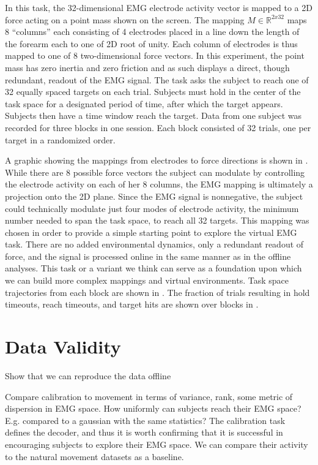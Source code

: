 \documentclass[../main.tex]{subfiles}
\begin{document}
In this task, the 32-dimensional EMG electrode activity vector is mapped to a 2D force acting on a point mass shown on the screen. The mapping $M\in\mathbb{R}^{2 x 32}$ maps 8 ``columns'' each consisting of 4 electrodes placed in a line down the length of the forearm each to one of 2D root of unity. Each column of electrodes is thus mapped to one of 8 two-dimensional force vectors. In this experiment, the point mass has zero inertia and zero friction and as such displays a direct, though redundant, readout of the EMG signal. The task asks the subject to reach one of 32 equally spaced targets on each trial. Subjects must hold in the center of the task space for a designated period of time, after which the target appears. Subjects then have a time window reach the target. Data from one subject was recorded for three blocks in one session. Each block consisted of 32 trials, one per target in a randomized order.

A graphic showing the mappings from electrodes to force directions is shown in . While there are 8 possible force vectors the subject can modulate by controlling the electrode activity on each of her 8 columns, the EMG mapping is ultimately a projection onto the 2D plane. Since the EMG signal is nonnegative, the subject could technically modulate just four modes of electrode activity, the minimum number needed to span the task space, to reach all 32 targets. This mapping was chosen in order to provide a simple starting point to explore the virtual EMG task. There are no added environmental dynamics, only a redundant readout of force, and the signal is processed online in the same manner as in the offline analyses. This task or a variant we think can serve as a foundation upon which we can build more complex mappings and virtual environments. Task space trajectories from each block are shown in . The fraction of trials resulting in hold timeouts, reach timeouts, and target hits are shown over blocks in .



\section{Data Validity}

Show that we can reproduce the data offline

Compare calibration to movement in terms of variance, rank, some metric of dispersion in EMG space.
How uniformly can subjects reach their EMG space? E.g. compared to a gaussian with the same statistics?
The calibration task defines the decoder, and thus it is worth confirming that it is successful in encouraging subjects to explore their EMG space. We can compare their activity to the natural movement datasets as a baseline.
\end{document}
